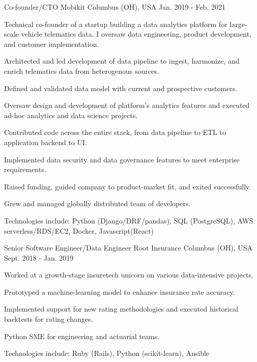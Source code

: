 \begin{cventries}
  \cventry
    {Co-founder/CTO} %
    {Mobikit} %
    {Columbus (OH), USA} %
    {Jan. 2019 - Feb. 2021} %
    {
      Technical co-founder of a startup building a data analytics platform for large-scale vehicle telematics data. I oversaw data engineering, product development, and customer implementation.
      \vspace{5.0mm}
      \begin{cvitems} %
        \item {Architected and led development of data pipeline to ingest, harmonize, and enrich telematics data from heterogenous sources.}
        \item {Defined and validated data model with current and prospective customers.}
        \item {Oversaw design and development of platform's analytics features and executed ad-hoc analytics and data science projects.}
        \item {Contributed code across the entire stack, from data pipeline to ETL to application backend to UI.}
        \item {Implemented data security and data governance features to meet enterprise requirements.}
        \item {Raised funding, guided company to product-market fit, and exited successfully.}
        \item {Grew and managed globally distributed team of developers.}
        \item {Technologies include: Python (Django/DRF/pandas), SQL (PostgreSQL), AWS serverless/RDS/EC2, Docker, Javascript(React)}
      \end{cvitems}
    }

  \cventry
    {Senior Software Engineer/Data Engineer} %
    {Root Insurance} %
    {Columbus (OH), USA} %
    {Sept. 2018 - Jan. 2019} %
    {
      Worked at a growth-stage insuretech unicorn on various data-intensive projects.
      \vspace{5.0mm}
      \begin{cvitems} %
        \item {Prototyped a machine-learning model to enhance insurance rate accuracy.}
        \item {Implemented support for new rating methodologies and executed historical backtests for rating changes.}
        \item {Python SME for engineering and actuarial teams.}
        \item {Technologies include: Ruby (Rails), Python (scikit-learn), Ansible}
      \end{cvitems}
    }


\end{cventries}
